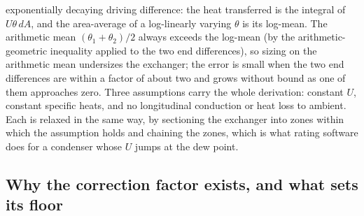 exponentially decaying driving difference: the heat transferred is the integral of
$U\theta\,dA$, and the area-average of a log-linearly varying $\theta$ is its
log-mean. The arithmetic mean $(\theta_1 + \theta_2)/2$ always exceeds the log-mean
(by the arithmetic-geometric inequality applied to the two end differences), so
sizing on the arithmetic mean undersizes the exchanger; the error is small when the
two end differences are within a factor of about two and grows without bound as one
of them approaches zero. Three assumptions carry the whole derivation: constant
$U$, constant specific heats, and no longitudinal conduction or heat loss to
ambient. Each is relaxed in the same way, by sectioning the exchanger into zones
within which the assumption holds and chaining the zones, which is what
rating software does for a condenser whose $U$ jumps at the dew point.

\subsection{Why the correction factor exists, and what sets its floor}

